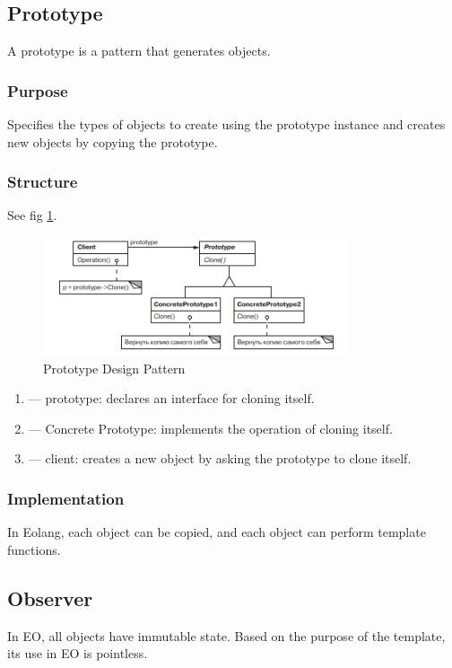\documentclass[sigplan,12pt,nonacm=true,review=false]{acmart}
\begin{document}
\subsection{Prototype}
A prototype is a pattern that generates objects.

\subsubsection{Purpose}
Specifies the types of objects to create using the prototype instance and creates new objects by copying the prototype.

\subsubsection{Structure}
See fig \ref{fig:7}.
\begin{figure}
    \centering
    \includegraphics[width=0.8\textwidth]{eolang/tr-02/assets/Picture7.png}
    \caption{Prototype Design Pattern}
    \label{fig:7}
\end{figure}

\begin{enumerate}
    \item — prototype: declares an interface for cloning itself.
    \item — Concrete Prototype: implements the operation of cloning itself.
    \item  — client: creates a new object by asking the prototype to clone itself.
\end{enumerate}

\subsubsection{Implementation}
In Eolang, each object can be copied, and each object can perform template functions.

\subsection{Observer}
In EO, all objects have immutable state. Based on the purpose of the template, its use in EO is pointless.
\end{document}
